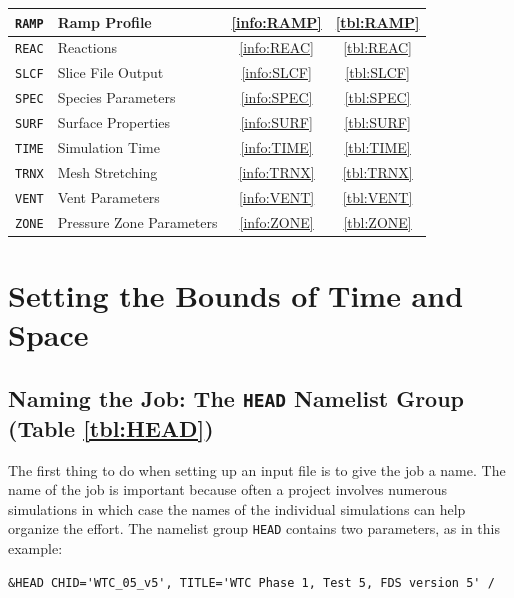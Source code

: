 \documentclass[11pt]{book}
\newcommand{\ct}{\tt\small}
\begin{document}
\begin{table}[ht]
\begin{center}
\begin{tabular}{|c|l|c|c|}
{\ct RAMP}  & Ramp Profile                 & \ref{info:RAMP} & \ref{tbl:RAMP}  \\ \hline
{\ct REAC}  & Reactions                    & \ref{info:REAC} & \ref{tbl:REAC}  \\ \hline
{\ct SLCF}  & Slice File Output            & \ref{info:SLCF} & \ref{tbl:SLCF}  \\ \hline
{\ct SPEC}  & Species Parameters           & \ref{info:SPEC} & \ref{tbl:SPEC}  \\ \hline
{\ct SURF}  & Surface Properties           & \ref{info:SURF} & \ref{tbl:SURF}  \\ \hline
{\ct TIME}  & Simulation Time              & \ref{info:TIME} & \ref{tbl:TIME}  \\ \hline
{\ct TRNX}  & Mesh Stretching              & \ref{info:TRNX} & \ref{tbl:TRNX}  \\ \hline
{\ct VENT}  & Vent Parameters              & \ref{info:VENT} & \ref{tbl:VENT}  \\ \hline
{\ct ZONE}  & Pressure Zone Parameters     & \ref{info:ZONE} & \ref{tbl:ZONE}  \\ \hline
\end{tabular}
\end{center}
\end{table}


\clearpage

\chapter{Setting the Bounds of Time and Space}


\section{Naming the Job: The \texorpdfstring{{\tt HEAD}}{HEAD} Namelist Group (Table \ref{tbl:HEAD})}
\label{info:HEAD}

The first thing to do when setting up an input file is to give the
job a name.  The name of the job is important because often a project
involves numerous simulations in which case the names of the individual
simulations can help organize the effort.  The namelist group {\ct HEAD} contains
two parameters, as in this example:

\footnotesize
\begin{verbatim}
&HEAD CHID='WTC_05_v5', TITLE='WTC Phase 1, Test 5, FDS version 5' /
\end{verbatim}
\normalsize
\end{document}
